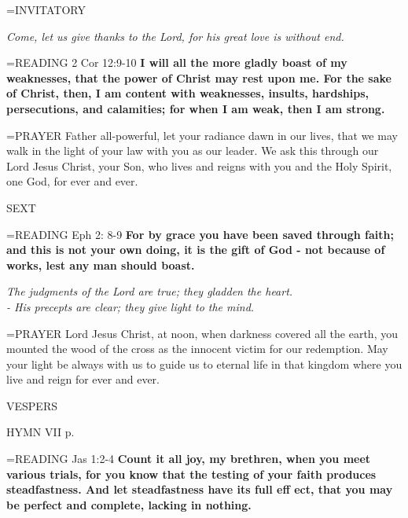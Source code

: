 \hangindent=\parindent \small{INVITATORY}
\begin{center}
\textit{Come, let us give thanks to the Lord, for his great love is without end.\\}
\end{center}

\hangindent=\parindent \small{READING} 2 Cor 12:9-10 \textbf{I will all the more gladly boast of my weaknesses, that the power of Christ may rest upon me. For the sake of Christ, then, I am content with weaknesses, insults, hardships, persecutions, and calamities; for when I am weak, then I am strong.\\}

\hangindent=\parindent \small{PRAYER  Father all-powerful, let your radiance dawn in our lives, that we may walk in the light of your law with you as our leader. We ask this through our Lord Jesus Christ, your Son, who lives and reigns with you and the Holy Spirit, one God, for ever and ever.}

\begin{flushleft}\normalsize SEXT\\\end{flushleft}
\hangindent=\parindent \small{READING} Eph 2: 8-9 \textbf{For by grace you have been saved through faith; and this is not your own doing, it is the gift of God - not because of works, lest any man should boast.}

\begin{center}
\textit{The judgments of the Lord are true; they gladden the heart.\\
- His precepts are clear; they give light to the mind.}
\end{center}

\hangindent=\parindent \small{PRAYER  Lord Jesus Christ, at noon, when darkness covered all the earth, you mounted the wood of the cross as the innocent victim for our redemption. May your light be always with us to guide us to eternal life in that kingdom where you live and reign for ever and ever.}

\begin{flushleft}\normalsize VESPERS\\\end{flushleft}
HYMN VII p. \pageref{ordinaryTime:lastHymn}

\hangindent=\parindent \small{READING} Jas 1:2-4 \textbf{Count it all joy, my brethren, when you meet various trials, for you know that the testing of your faith produces steadfastness. And let steadfastness have its full eff ect, that you may be perfect and complete, lacking in nothing.\\}

